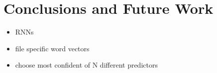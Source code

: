 \section{Conclusions and Future Work}
\label{sec:conclusions}

\begin{itemize}
  \item RNNs
  \item file specific word vectors
  \item choose most confident of N different predictors
\end{itemize}
